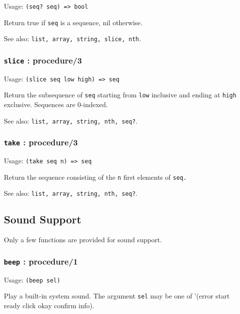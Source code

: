 \documentclass[
]{article}
\newcommand{\passthrough}[1]{#1}
\begin{document}
Usage: \passthrough{\lstinline!(seq? seq) => bool!}

Return true if \passthrough{\lstinline!seq!} is a sequence, nil
otherwise.

See also: \passthrough{\lstinline!list, array, string, slice, nth!}.

\hypertarget{slice-procedure3}{%
\subsubsection{\texorpdfstring{\texttt{slice} :
procedure/3}{slice : procedure/3}}\label{slice-procedure3}}

Usage: \passthrough{\lstinline!(slice seq low high) => seq!}

Return the subsequence of \passthrough{\lstinline!seq!} starting from
\passthrough{\lstinline!low!} inclusive and ending at
\passthrough{\lstinline!high!} exclusive. Sequences are 0-indexed.

See also: \passthrough{\lstinline!list, array, string, nth, seq?!}.

\hypertarget{take-procedure3}{%
\subsubsection{\texorpdfstring{\texttt{take} :
procedure/3}{take : procedure/3}}\label{take-procedure3}}

Usage: \passthrough{\lstinline!(take seq n) => seq!}

Return the sequence consisting of the \passthrough{\lstinline!n!} first
elements of \passthrough{\lstinline!seq.!}

See also: \passthrough{\lstinline!list, array, string, nth, seq?!}.

\hypertarget{sound-support}{%
\subsection{Sound Support}\label{sound-support}}

Only a few functions are provided for sound support.

\hypertarget{beep-procedure1}{%
\subsubsection{\texorpdfstring{\texttt{beep} :
procedure/1}{beep : procedure/1}}\label{beep-procedure1}}

Usage: \passthrough{\lstinline!(beep sel)!}

Play a built-in system sound. The argument \passthrough{\lstinline!sel!}
may be one of '(error start ready click okay confirm info).
\end{document}
